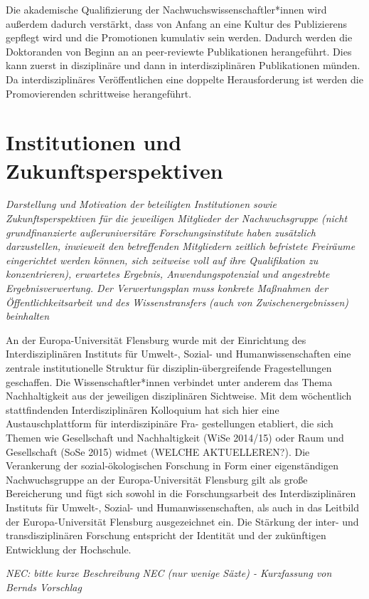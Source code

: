 \documentclass[a4paper,11pt,twoside]{scrartcl}
\begin{document}
Die akademische Qualifizierung der Nachwuchswissenschaftler*innen wird außerdem dadurch verstärkt, dass von Anfang an eine Kultur des Publizierens gepflegt wird und die Promotionen kumulativ sein werden. Dadurch werden die Doktoranden von Beginn an an peer-reviewte Publikationen herangeführt. Dies kann zuerst in disziplinäre und dann in interdisziplinären Publikationen münden. Da interdisziplinäres Veröffentlichen eine doppelte Herausforderung ist werden die Promovierenden schrittweise herangeführt.

\section{Institutionen und Zukunftsperspektiven}
\textit{Darstellung und Motivation der beteiligten Institutionen sowie Zukunftsperspektiven für die jeweiligen Mitglieder der Nachwuchsgruppe (nicht grundfinanzierte außeruniversitäre Forschungsinstitute haben zusätzlich darzustellen, inwieweit den betreffenden Mitgliedern zeitlich befristete Freiräume eingerichtet werden können, sich zeitweise voll auf ihre Qualifikation zu konzentrieren), erwartetes Ergebnis, Anwendungspotenzial und angestrebte Ergebnisverwertung. Der Verwertungsplan muss konkrete Maßnahmen der Öffentlichkeitsarbeit und des Wissenstransfers (auch von Zwischenergebnissen) beinhalten}


An der Europa-Universität Flensburg wurde mit der Einrichtung des Interdisziplinären Instituts für Umwelt-, Sozial- und Humanwissenschaften eine zentrale institutionelle Struktur für disziplin-übergreifende Fragestellungen geschaffen. Die Wissenschaftler*innen verbindet unter anderem das Thema Nachhaltigkeit aus der jeweiligen disziplinären Sichtweise. Mit dem wöchentlich stattfindenden Interdisziplinären Kolloquium hat sich hier eine Austauschplattform für interdiszipinäre Fra-
gestellungen etabliert, die sich Themen wie Gesellschaft und Nachhaltigkeit (WiSe 2014/15) oder Raum und Gesellschaft (SoSe 2015) widmet (WELCHE AKTUELLEREN?). Die Verankerung der sozial-ökologischen Forschung in Form einer eigenständigen Nachwuchsgruppe an der Europa-Universität Flensburg gilt als große Bereicherung und fügt sich sowohl in die Forschungsarbeit des Interdisziplinären Instituts für Umwelt-, Sozial- und Humanwissenschaften, als auch in das Leitbild der Europa-Universität Flensburg ausgezeichnet ein. Die Stärkung der inter- und transdisziplinären Forschung entspricht der Identität und der zukünftigen Entwicklung der Hochschule.

\textit{NEC: bitte kurze Beschreibung NEC (nur wenige Säzte) - Kurzfassung von Bernds Vorschlag}
\end{document}
